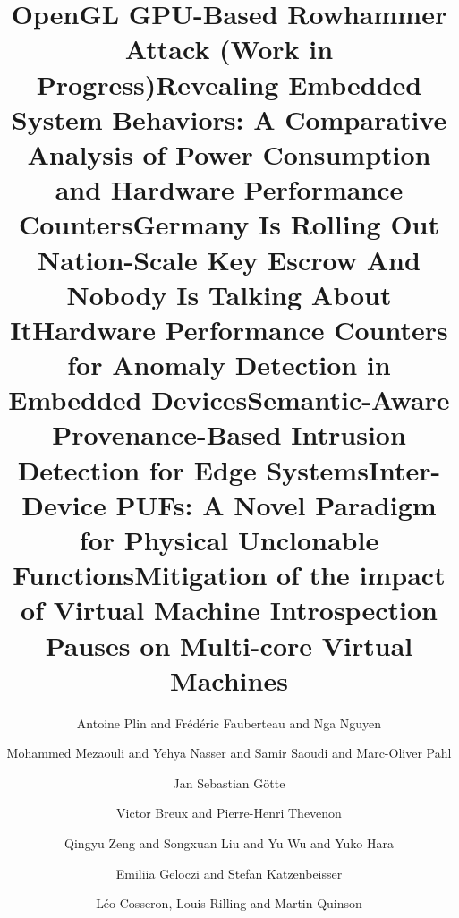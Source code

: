 \documentclass[runningheads]{llncs}
\begin{document}
\setcounter{page}{1}
\author{Antoine Plin and Fr\'ed\'eric Fauberteau and Nga Nguyen}
\title{OpenGL GPU-Based Rowhammer Attack (Work in Progress)}
\maketitle
\clearpage

\setcounter{page}{2}
\author{Mohammed Mezaouli and Yehya Nasser and Samir Saoudi and Marc-Oliver Pahl}
\title{Revealing Embedded System Behaviors: A Comparative Analysis of Power Consumption and Hardware Performance Counters}
\maketitle
\clearpage

\setcounter{page}{3}
\author{Jan Sebastian G\"otte}
\title{Germany Is Rolling Out Nation-Scale Key Escrow And Nobody Is Talking About It}
\maketitle
\clearpage

\setcounter{page}{4}
\author{Victor Breux and Pierre-Henri Thevenon}
\title{Hardware Performance Counters for Anomaly Detection in Embedded Devices}
\maketitle
\clearpage

\setcounter{page}{5}
\author{Qingyu Zeng and Songxuan Liu and Yu Wu and Yuko Hara}
\title{Semantic-Aware Provenance-Based Intrusion Detection for Edge Systems}
\maketitle
\clearpage

\setcounter{page}{6}
\author{Emiliia Geloczi and Stefan Katzenbeisser}
\title{Inter-Device PUFs: A Novel Paradigm for Physical Unclonable Functions}
\maketitle
\clearpage

\setcounter{page}{7}
\author{L\'eo Cosseron, Louis Rilling and Martin Quinson}
\title{Mitigation of the impact of Virtual Machine Introspection Pauses on Multi-core Virtual Machines}
\maketitle
\clearpage


\setcounter{page}{8}
\phantom{Author Index}
\clearpage
\end{document}
